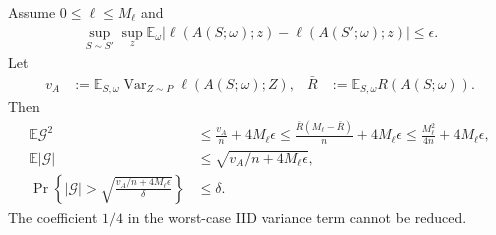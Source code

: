 \begin{theorem}
\label{thm:rigid-gen-second-moment}
Assume $0\le\ell\le M_\ell$ and
\begin{align}
 \sup_{S\sim S'}\sup_z\mathbb E_\omega
 |\ell(A(S;\omega);z)-\ell(A(S';\omega);z)|\le\epsilon.
\end{align}
Let
\begin{align}
 v_A&:=\mathbb E_{S,\omega}\operatorname{Var}_{Z\sim P}\ell(A(S;\omega);Z),&
 \bar R&:=\mathbb E_{S,\omega}R(A(S;\omega)).
\end{align}
Then
\begin{align}\label{eq:sharp-gen-second-moment}
 \mathbb E\mathcal G^2
 &\le\frac{v_A}{n}+4M_\ell\epsilon
 \le\frac{\bar R(M_\ell-\bar R)}n+4M_\ell\epsilon
 \le\frac{M_\ell^2}{4n}+4M_\ell\epsilon,\\
 \mathbb E|\mathcal G|
 &\le\sqrt{v_A/n+4M_\ell\epsilon},\\
 \Pr\left\{|\mathcal G|>\sqrt{\frac{v_A/n+4M_\ell\epsilon}{\delta}}\right\}&\le\delta.
\end{align}
The coefficient $1/4$ in the worst-case IID variance term cannot be reduced.
\end{theorem}
